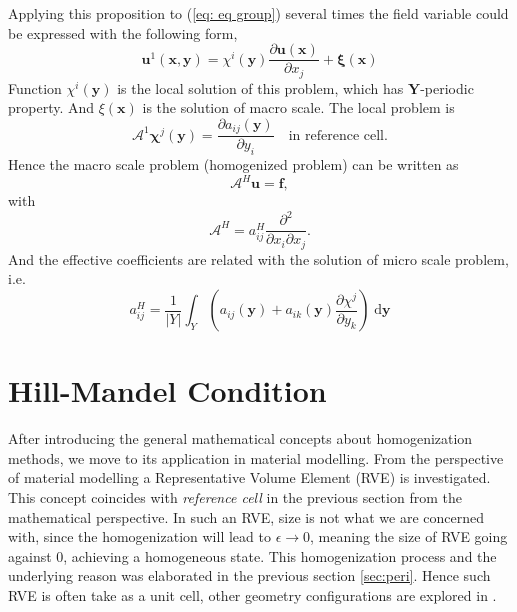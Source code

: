 \documentclass[10pt,a4paper]{scrreprt}
\newcommand{\myd}{\;\mathrm{d}}
\begin{document}
Applying this proposition to (\ref{eq: eq group}) several times the field variable could be expressed with the following form,
\begin{equation}
\mathbf{u}^{1}(\mathbf{x}, \mathbf{y}) = \chi^{i}(\mathbf{y}) \dfrac{\partial \mathbf{u}(\mathbf{x})}{\partial x_{j}} + \mathbf{\xi} (\mathbf{x})
\end{equation}
Function $\chi^{i}(\mathbf{y})$ is the local solution of this problem, which has $\mathbf{Y}$-periodic property. And $\xi(\mathbf{x})$ is the solution of macro scale. The local problem is
\begin{equation}
\mathcal{A}^{1} \mathbf{\chi}^{j}(\mathbf{y}) = \dfrac{\partial a_{ij}(\mathbf{y})}{\partial y_{i}} \quad \text{in reference cell}.
\end{equation}
Hence the macro scale problem (homogenized problem) can be written as
\begin{equation}
\mathcal{A}^{H} \mathbf{u} = \mathbf{f},
\end{equation}
with
\begin{equation}
\mathcal{A}^{H} = a^{H}_{ij} \dfrac{\partial^{2}}{\partial x_{i} \partial x_{j}}.
\end{equation}
%
And the effective coefficients are related with the solution of micro scale problem, i.e.
\begin{equation}
a^{H}_{ij} = \dfrac{1}{|Y|} \int_{Y} \left( a_{ij}(\mathbf{y}) + a_{ik}(\mathbf{y}) \dfrac{\partial \chi^{j}}{\partial y_{k}} \right) \myd{\mathbf{y}}
\end{equation}

\section{Hill-Mandel Condition}
After introducing the general mathematical concepts about homogenization methods, we move to its application in material modelling. From the perspective of material modelling a Representative Volume Element (RVE) is investigated. This concept coincides with \textit{reference cell} in the previous section from the mathematical perspective. In such an RVE, size is not what we are concerned with, since the homogenization will lead to $\epsilon \to 0$, meaning the size of RVE going against 0, achieving a homogeneous state. This homogenization process and the underlying reason was elaborated in the previous section \ref{sec:peri}. Hence such RVE is often take as a unit cell, other geometry configurations are explored in \citep{gluge2012comparison}. 
\end{document}
